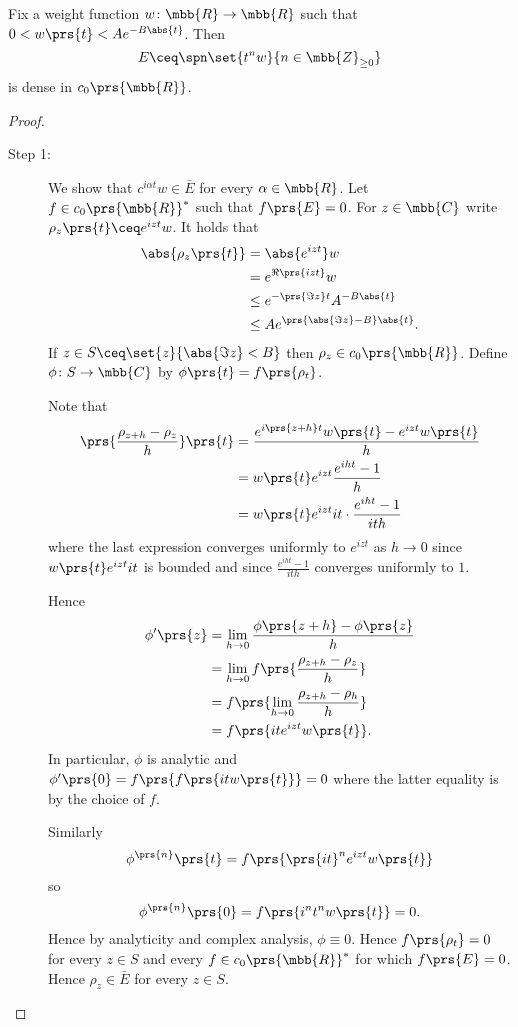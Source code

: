 \documentclass[10pt, twoside]{book}
\begin{document}
\begin{theorem}
Fix a weight function $w \colon \mbb{R} \to \mbb{R}$ such that $0 < w\prs{t} < A e^{-B \abs{t}}$.
Then
\[E \ceq \spn\set{t^n w}{n \in \mbb{Z}_{\geq 0}}\]
is dense in $c_0\prs{\mbb{R}}$.
\end{theorem}

\begin{proof}
\begin{description}
\item[Step 1:]

We show that $c^{i \alpha t}w \in \bar{E}$ for every $\alpha \in \mbb{R}$.
Let $f \in c_0\prs{\mbb{R}}^*$ such that $f\prs{E} = 0$. For $z \in \mbb{C}$ write $\rho_z\prs{t} \ceq e^{i z t} w$.
It holds that
\begin{align*}
\abs{\rho_z\prs{t}} &= \abs{e^{i z t}}w
\\&=
e^{\Re\prs{i z t}} w
\\&\leq
e^{-\prs{\Im z}t} A^{- B \abs{t}}
\\&\leq
A e^{\prs{\abs{\Im z} - B}\abs{t}} \text{.}
\end{align*}
If $z \in S \ceq \set{z}{\abs{\Im z} < B}$ then $\rho_z \in c_0\prs{\mbb{R}}$. Define $\phi \colon S \to \mbb{C}$ by $\phi\prs{t} = f\prs{\rho_t}$.

Note that
\begin{align*}
\prs{\frac{\rho_{z+h} - \rho_z}{h}}\prs{t} &= \frac{e^{i\prs{z+h} t} w\prs{t} - e^{izt} w\prs{t}}{h}
\\&=
w\prs{t} e^{i z t} \frac{e^{iht} - 1}{h}
\\&=
w\prs{t} e^{i z t} it \cdot \frac{e^{iht} - 1}{ith}
\end{align*}
where the last expression converges uniformly to $e^{izt}$ as $h \to 0$ since $w\prs{t} e^{i z t} it$ is bounded and since $\frac{e^{iht} - 1}{ith}$ converges uniformly to $1$.

Hence
\begin{align*}
\phi'\prs{z}
&=
\lim_{h \to 0} \frac{\phi\prs{z+h} - \phi\prs{z}}{h}
\\&=
\lim_{h \to 0} f\prs{\frac{\rho_{z + h} - \rho_z}{h}}
\\&=
f \prs{\lim_{h \to 0} \frac{\rho_{z+h} - \rho_h}{h}}
\\&=
f\prs{it e^{izt} w\prs{t}} \text{.}
\end{align*}
In particular, $\phi$ is analytic and $\phi'\prs{0} = f\prs{f\prs{it w\prs{t}}} = 0$ where the latter equality is by the choice of $f$.

Similarly 
\[\phi^{\prs{n}}\prs{t} = f\prs{\prs{it}^n e^{izt} w\prs{t}}\]
so
\[\phi^{\prs{n}}\prs{0} = f\prs{i^n t^n w\prs{t}} = 0 \text{.}\]
Hence by analyticity and complex analysis, $\phi \equiv 0$. Hence $f\prs{\rho_t} = 0$ for every $z \in S$ and every $f \in c_0\prs{\mbb{R}}^*$ for which $f\prs{E} = 0$.
Hence $\rho_z \in \bar{E}$ for every $z \in S$.


\end{description}
\end{proof}
\end{document}
